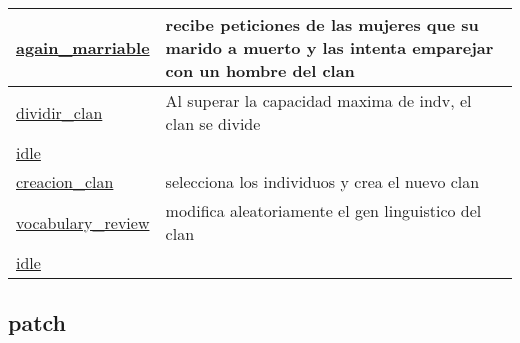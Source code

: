 \documentclass[a4paper,11pt]{article}
\begin{document}
\begin{longtable}[H!]{ll}
\midrule
\parbox{5cm}{\url{again_marriable}}  & \parbox{10cm}{recibe peticiones de las mujeres que su marido a muerto y las intenta emparejar con un hombre del clan} \\
\midrule
\parbox{5cm}{\url{dividir_clan}}  & \parbox{10cm}{Al superar la capacidad maxima de indv, el clan se divide} \\
\midrule
\parbox{5cm}{\url{idle}}  & \parbox{10cm}{} \\
\midrule
\parbox{5cm}{\url{creacion_clan}}  & \parbox{10cm}{selecciona los individuos y crea el nuevo clan} \\
\midrule
\parbox{5cm}{\url{vocabulary_review}}  & \parbox{10cm}{modifica aleatoriamente el gen linguistico del clan} \\
\midrule
\parbox{5cm}{\url{idle}}  & \parbox{10cm}{} \\
\end{longtable}

\subsection{patch}
\end{document}
